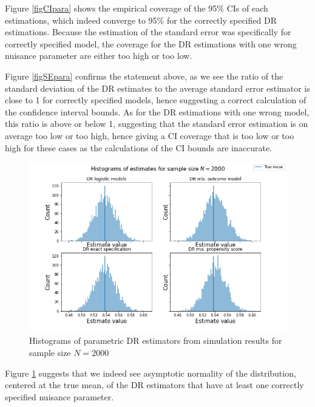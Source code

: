 \documentclass[12pt,twoside]{article}
\begin{document}
Figure \ref{figCIpara} shows the empirical coverage of the 95\% CIs of each estimations, which indeed converge to 95\% for the correctly specified DR estimations. Because the estimation of the standard error was specifically for correctly specified model, the coverage for the DR estimations with one wrong nuisance parameter are either too high or too low.

Figure \ref{figSEpara} confirms the statement above, as we see the ratio of the standard deviation of the DR estimates to the average standard error estimator is close to 1 for correctly specified models, hence suggesting a correct calculation of the confidence interval bounds. As for the DR estimations with one wrong model, this ratio is above or below 1, suggesting that the standard error estimation is on average too low or too high, hence giving a CI coverage that is too low or too high for these cases as the calculations of the CI bounds are inaccurate.

\begin{figure}[h!]
    \centering
    \includegraphics[width = 0.9\columnwidth]{figures/histpara.png}
    \caption{Histograms of parametric DR estimators from simulation results for sample size $N = 2000$}
    \label{fighistpara}
\end{figure}

Figure \ref{fighistpara} suggests that we indeed see asymptotic normality of the distribution, centered at the true mean, of the DR estimators that have at least one correctly specified nuisance parameter.\\
\end{document}
